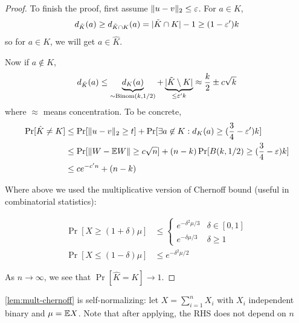 \begin{proof}
    To finish the proof, first assume $\|u - v\|_2 \leq \varepsilon$.
    For $a \in K$,
    \begin{align}
        d_{\tilde{K}}(a)
        \geq d_{\tilde{K} \cap K}(a)
        = \lvert \tilde{K} \cap K \rvert - 1
        \geq (1 - \varepsilon') k
    \end{align}
    so for $a \in K$, we will get $a \in \hat{K}$.
    
    Now if $a \not\in K$,
    \begin{align}
        d_{\tilde{K}}(a)
        \leq \underbrace{d_K(a)}_{\sim \text{Binom}(k, 1/2)} + \underbrace{\lvert \tilde{K} \setminus K \rvert}_{\leq \varepsilon' k}
        \approx \frac{k}{2} \pm c \sqrt{k}
    \end{align}
    where $\approx$ means concentration. To be concrete,
    \begin{align}
        \Pr[\hat{K} \neq K]
        &\leq \Pr[\|u - v\|_2 \geq t]
        + \Pr[\exists a \not\in K : d_K(a) \geq (\frac{3}{4} - \varepsilon') k] \\
        &\leq \Pr[ \|W - \mathbb{E} W\| \geq c \sqrt{n} ]
        + (n - k) \Pr[B(k, 1/2) \geq (\frac{3}{4} - \varepsilon) k] \\
        &\leq c e^{-c' n} + (n - k)
    \end{align}
    
    Where above we used the multiplicative version of Chernoff bound 
    (useful in combinatorial statistics):
    \begin{lemma}\label{lem:mult-chernoff}
        \begin{align}
            \Pr[X \geq (1 + \delta) \mu]
            &\leq \begin{cases}
                e^{-\delta^2 \mu / 3} &\delta \in [0,1] \\
                e^{-\delta \mu / 3} &\delta \geq 1
            \end{cases} \\
            \Pr[X \leq (1 - \delta) \mu]
            &\leq e^{-\delta^2 \mu / 2}
        \end{align}
    \end{lemma}
    
    As $n \to \infty$, we see that $\Pr[\hat{K} = K] \to 1$.
\end{proof}

\cref{lem:mult-chernoff} is self-normalizing: let $X = \sum_{i=1}^n X_i$ with $X_i$ independent binary
and $\mu = \mathbb{E} X$. Note that after applying, the RHS does not depend on $n$ 


